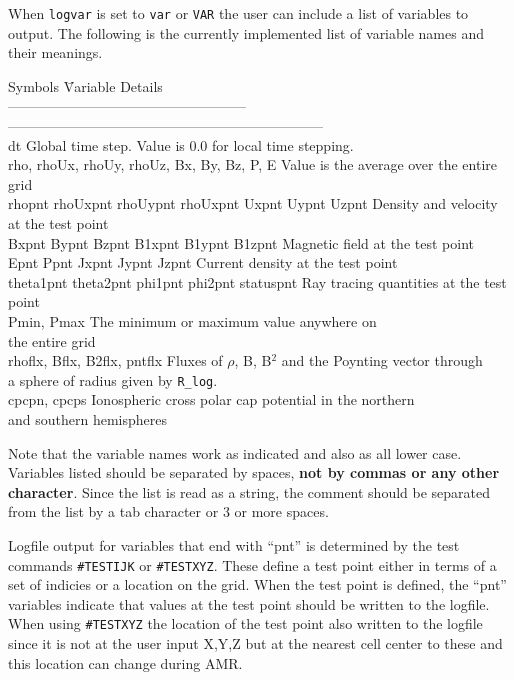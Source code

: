 When {\tt logvar} is set to {\tt var} or {\tt VAR} the user can include a list of
variables to output.
The following is the currently implemented list of
variable names and their meanings.
\begin{tabbing}
Symbols \hspace{2.75in} \= Variable Details \\
--------------------------------------------------- \> 
-------------------------------------------------------------------- \\
dt          \> Global time step.  Value is 0.0 for local time stepping. \\
rho, rhoUx, rhoUy, rhoUz, Bx, By, Bz, P, E \> Value is the average over the entire grid \\
rhopnt rhoUxpnt rhoUypnt rhoUxpnt Uxpnt Uypnt Uzpnt  \> 
                                               Density and velocity at the test point \\
Bxpnt Bypnt Bzpnt B1xpnt B1ypnt B1zpnt \> Magnetic field at the test point \\
Epnt Ppnt Jxpnt Jypnt Jzpnt   \> Current density at the test point \\
theta1pnt theta2pnt phi1pnt phi2pnt statuspnt \> Ray tracing quantities at the test point \\
Pmin, Pmax  \> The minimum or maximum value anywhere on \\ 
               \> \hspace{.25in} the entire grid \\
rhoflx, Bflx, B2flx, pntflx \> Fluxes of $\rho$, B, B$^2$ and the Poynting vector  
                            through \\ \> \hspace{.25in} 
                            a sphere of radius given by {\tt R\_log}. \\
cpcpn, cpcps   \> Ionospheric cross polar cap potential in the northern \\
               \> \hspace{.25in} and southern hemispheres
\end{tabbing}
Note that the variable names work as indicated and also as all lower case.
Variables listed should be separated by spaces, {\bf not by commas or any other
character}.  Since the list is read as a string, the comment should be separated
from the list by a tab character or 3 or more spaces.

Logfile output for variables that end with ``pnt'' is determined by the test
commands {\tt \#TESTIJK} or {\tt \#TESTXYZ}.  These define a test point either
in terms of a set of indicies or a location on the grid.  When the test point is
defined, the ``pnt'' variables indicate that values at the test point should
be written to the logfile.  When using {\tt \#TESTXYZ} the location of the
test point also written to the logfile since it is not at the user input X,Y,Z
but at the nearest cell center to these and this location can change during AMR.

